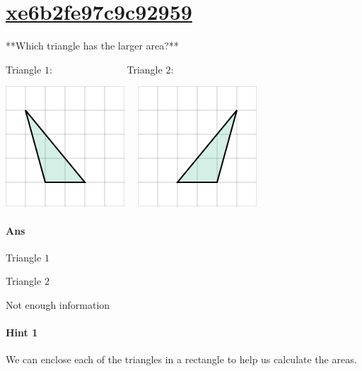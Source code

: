 \documentclass[twocolumn,10pt]{article}
\def\shrinkfactor{0.55}
\begin{document}
\section{\href{https://www.khanacademy.org/devadmin/content/items/xe6b2fe97c9c92959}{xe6b2fe97c9c92959}}

\noindent
**Which triangle has the larger area?**  

Triangle $1$:  $\qquad\qquad \qquad ~~~~$ Triangle $2$:  

\includegraphics[scale=\shrinkfactor]{figures/9f2002eedd62178a3ce9e26198e205d26342422f.png}$\quad$ 
\includegraphics[scale=\shrinkfactor]{figures/dc0e8470e25253d17fd6faaff4da3897941fe7e9.png}

\paragraph{Ans} 

Triangle $1$

Triangle $2$


 Not enough information



\paragraph{Hint 1}We can enclose each of the triangles in a rectangle to help us calculate the areas.  
\end{document}
